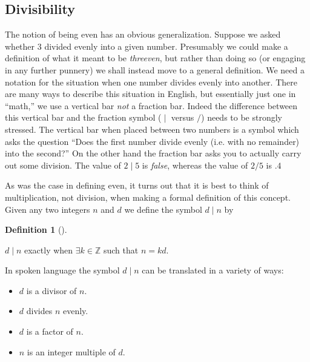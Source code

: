\documentclass[10pt,]{book}
\theoremstyle{plain}
\theoremstyle{definition}
\newtheorem{definition}[theorem]{Definition}
\theoremstyle{definition}
\numberwithin{equation}{section}
\newcommand{\divides}{\!\mid\!}
\newcommand{\Integers}{{\mathbb Z}}
\begin{document}
\subsection[{Divisibility}]{Divisibility}\label{div}

      The notion of being even has an obvious generalization. Suppose
      we asked whether \(3\) divided evenly into a given number. Presumably
      we could make a definition of what it meant to be \emph{threeven}, but
      rather than doing so (or engaging in any further punnery) we shall
      instead move to a general definition. We need a notation for the
      situation when one number divides evenly into another. There are
      many ways to describe this situation in English, but essentially
      just one in ``math,'' we use a vertical bar \textemdash{} \emph{not} a fraction
      bar. Indeed the difference between this vertical bar and the
      fraction symbol (\(\divides\) versus \(/\)) needs to
      be strongly stressed. The vertical bar
      when placed between two numbers is a symbol which asks the question
      ``Does the first number divide evenly (i.e. with no remainder) into
      the second?'' On the other hand the fraction bar asks you to actually
      carry out some division. The value of \(2\divides 5\) is \emph{false}, whereas
      the value of \(2/5\) is \(.4\)
\par

      As was the case in defining even, it turns out that it is best
      to think of multiplication, not division, when making a formal
      definition of this concept. Given any two integers \(n\) and \(d\)
      we define the symbol \(d\divides n\) by
\begin{definition}[{}]\label{definition-5}

          \(d \divides n\) exactly when \(\exists k \in \Integers\) such that \(n = kd\).
\end{definition}
\par

    In spoken language the symbol \(d \divides n\) can be translated in a variety
    of ways:

    \leavevmode%
\begin{itemize}[label=\textbullet]
\item{}
          \(d\) is a divisor of \(n\).
\item{}
          \(d\) divides \(n\) evenly.
\item{}
          \(d\) is a factor of \(n\).
\item{}
          \(n\) is an integer multiple of \(d\).
\end{itemize}
\end{document}
